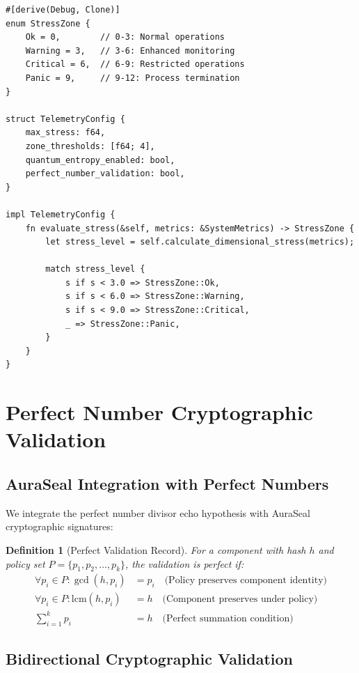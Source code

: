 \documentclass[a4paper,12pt]{article}
\newtheorem{definition}{Definition}
\begin{document}
\begin{lstlisting}[style=rustcode, caption={Rust telemetry integration}]
#[derive(Debug, Clone)]
enum StressZone {
    Ok = 0,        // 0-3: Normal operations
    Warning = 3,   // 3-6: Enhanced monitoring  
    Critical = 6,  // 6-9: Restricted operations
    Panic = 9,     // 9-12: Process termination
}

struct TelemetryConfig {
    max_stress: f64,
    zone_thresholds: [f64; 4],
    quantum_entropy_enabled: bool,
    perfect_number_validation: bool,
}

impl TelemetryConfig {
    fn evaluate_stress(&self, metrics: &SystemMetrics) -> StressZone {
        let stress_level = self.calculate_dimensional_stress(metrics);
        
        match stress_level {
            s if s < 3.0 => StressZone::Ok,
            s if s < 6.0 => StressZone::Warning,
            s if s < 9.0 => StressZone::Critical,
            _ => StressZone::Panic,
        }
    }
}
\end{lstlisting}

\section{Perfect Number Cryptographic Validation}

\subsection{AuraSeal Integration with Perfect Numbers}

We integrate the perfect number divisor echo hypothesis with AuraSeal cryptographic signatures:

\begin{definition}[Perfect Validation Record]
For a component with hash $h$ and policy set $P = \{p_1, p_2, \ldots, p_k\}$, the validation is perfect if:
\begin{align}
\forall p_i \in P: \gcd(h, p_i) &= p_i \quad \text{(Policy preserves component identity)} \\
\forall p_i \in P: \text{lcm}(h, p_i) &= h \quad \text{(Component preserves under policy)} \\
\sum_{i=1}^k p_i &= h \quad \text{(Perfect summation condition)}
\end{align}
\end{definition}

\subsection{Bidirectional Cryptographic Validation}
\end{document}
